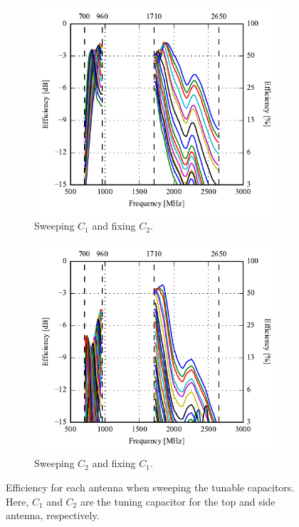 \begin{figure}[htbp]
    \centering
    \begin{subfigure}{0.49\linewidth}
        \includegraphics{img/tech_sol/monopole/5mm/meas/efficiency_top}
        \caption{Sweeping $C_1$ and fixing $C_2$.}
    \end{subfigure}
    \hfill
    \begin{subfigure}{0.49\linewidth}
        \includegraphics{img/tech_sol/monopole/5mm/meas/efficiency_side}
        \caption{Sweeping $C_2$ and fixing $C_1$.}
    \end{subfigure}
    \caption{Efficiency for each antenna when sweeping the tunable capacitors. Here, $C_1$ and $C_2$ are the tuning capacitor for the top and side antenna, respectively.}
    \label{fig:eff_mono_mini_meas}
\end{figure}



